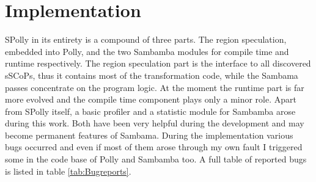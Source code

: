 
\chapter{Implementation} %
\label{Chapter4}


SPolly in its entirety is a compound of three parts. The region speculation, 
embedded into Polly, and the two Sambamba modules  for compile time and
runtime respectively. The region speculation part is the interface
to all discovered sSCoPs, thus it contains most of the transformation code, 
while the Sambama passes concentrate on the program logic. 
At the moment the runtime part is far more evolved and the compile time component
plays only a minor role. Apart from SPolly itself, a basic profiler and a
statistic module for Sambamba arose during this work. Both have been very helpful
during the development and may become permanent features of Sambama.
   During the implementation various bugs occurred and even if most of them
arose through my own fault I triggered some in the code base of Polly and 
Sambamba too. A full table of reported bugs is listed in table 
\ref{tab:Bugreports}. 

